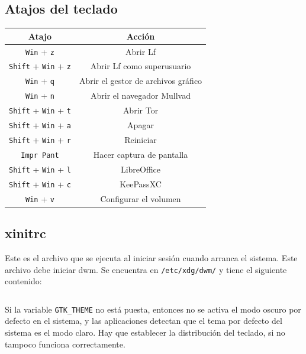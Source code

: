 \documentclass{article}
\begin{document}
    \subsection{Atajos del teclado}
    \begin{table}[h]
    	   \begin{tabular}{cc}
    	   	   \midrule
		   Atajo	&	Acción	\\
		   \midrule

		   \texttt{Win} + \texttt{z}	&	Abrir Lf	\\
           \texttt{Shift} + \texttt{Win} + \texttt{z}   &   Abrir Lf como superusuario  \\
           \texttt{Win} + \texttt{q}    &   Abrir el gestor de archivos gráfico \\
		   \texttt{Win} + \texttt{n}	&	Abrir el navegador Mullvad	\\
		   \texttt{Shift} + \texttt{Win} + \texttt{t}	&	Abrir Tor	\\
		   \texttt{Shift} + \texttt{Win} + \texttt{a}	&	Apagar	\\
		   \texttt{Shift} + \texttt{Win} + \texttt{r}	&	Reiniciar	\\
		   \texttt{Impr Pant}	&	Hacer captura de pantalla	\\
		   \texttt{Shift} + \texttt{Win} + \texttt{l}	&	LibreOffice	\\
		   \texttt{Shift} + \texttt{Win} + \texttt{c}	&	KeePassXC	\\
		   \texttt{Win} + \texttt{v}	&	Configurar el volumen	\\
		   \midrule
    	   \end{tabular}
    \end{table}

    \subsection{xinitrc}
    Este es el archivo que se ejecuta al iniciar sesión cuando arranca el sistema. Este archivo debe iniciar dwm. Se encuentra en \texttt{/etc/xdg/dwm/} y tiene el siguiente contenido:

    \inputminted[breaklines, breakanywhere, breaksymbolleft="", breaksymbolright="", breakanywheresymbolpre="", breakanywheresymbolpost=""]
    {bash}{inc/xinitrc}
    
    Si la variable \texttt{GTK\_THEME} no está puesta, entonces no se activa el modo oscuro por defecto en el sistema, y las aplicaciones detectan que el tema por defecto del sistema es el modo claro. Hay que establecer la distribución del teclado, si no tampoco funciona correctamente.
\end{document}
